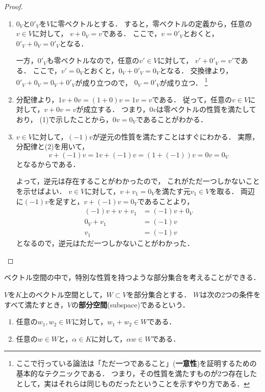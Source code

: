 \begin{proof}
    \begin{enumerate}
        \item $0_V$と$0'_V$を$V$に零ベクトルとする．
        すると，零ベクトルの定義から，任意の$v \in V$に対して，
        $v + 0_V = v$である．
        ここで，$v = 0'_V$とおくと，$0'_V + 0_V = 0'_V$となる．
        
        一方，$0'_V$も零ベクトルなので，任意の$v' \in V$に対して，
        $v' + 0'_V = v'$である．
        ここで，$v' = 0_V$とおくと，$0_V + 0'_V = 0_V$となる．
        交換律より，$0'_V + 0_V = 0_V + 0'_V$が成り立つので，
        $0_V = 0'_V$が成り立つ．
        \footnote{ここで行っている論法は「ただ一つであること」(\textbf{一意性})を証明するための基本的なテクニックである．
        つまり，その性質を満たすものが2つ存在したとして，実はそれらは同じものだったということを示すやり方である．}
        \item 分配律より，$1v + 0v = (1 + 0) v = 1v = v$である．
        従って，任意の$v \in V$に対して，$v + 0v = v$が成立する．
        つまり，$0v$は零ベクトルの性質を満たしており，
        (1)で示したことから，$0v=0_V$であることがわかる．
        \item $v \in V$に対して，$(-1)v$が逆元の性質を満たすことはすぐにわかる．
        実際，分配律と(2)を用いて，
        \[
            v + (-1)v = 1v + (-1)v = (1 + (-1))v = 0v = 0_V
        \]
        となるからである．
        
        よって，逆元は存在することがわかったので，
        これがただ一つしかないことを示せばよい．
        $v \in V$に対して，$v + v_1 = 0_V$を満たす元$v_1\in V$を取る．
        両辺に$(-1)v$を足すと，$v + (-1)v = 0_V$であることより，
        \[
            \begin{aligned}
                (-1)v + v + v_1 &= (-1)v + 0_V \\
                0_V + v_1 &= (-1)v \\
                v_1 &= (-1)v
            \end{aligned}
        \]
        となるので，逆元はただ一つしかないことがわかった．
    \end{enumerate}
\end{proof}
ベクトル空間の中で，特別な性質を持つような部分集合を考えることができる．
\begin{dfn}\label{dfn:subspace}
    $V$を$K$上のベクトル空間として，$W \subset V$を部分集合とする．
    $W$は次の2つの条件をすべて満たすとき，$V$の\textbf{部分空間}(subspace)であるという．
    \begin{enumerate}
        \item 任意の$w_1,w_2 \in W$に対して，$w_1 + w_2 \in W$である．
        \item 任意の$w \in W$と，$\alpha \in K$に対して，$\alpha w \in W$である．
    \end{enumerate}
\end{dfn}

